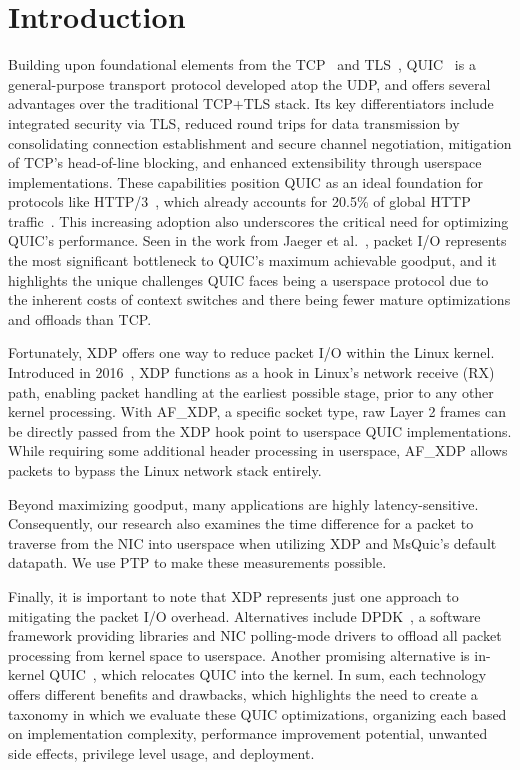 \chapter{Introduction}
\label{chap:introduction}

Building upon foundational elements from the \ac{TCP}~\cite{rfc9293} and \ac{TLS}~\cite{rfc8446}, QUIC~\cite{rfc9000} is a general-purpose transport protocol developed atop the \ac{UDP}, and offers several advantages over the traditional \ac{TCP}+\ac{TLS} stack. Its key differentiators include integrated security via \ac{TLS}, reduced round trips for data transmission by consolidating connection establishment and secure channel negotiation, mitigation of \ac{TCP}'s head-of-line blocking, and enhanced extensibility through userspace implementations. These capabilities position QUIC as an ideal foundation for protocols like \ac{HTTP/3}~\cite{rfc9114}, which already accounts for 20.5\% of global HTTP traffic~\cite{cloudflare2024}. This increasing adoption also underscores the critical need for optimizing QUIC's performance. Seen in the work from Jaeger et al.~\cite{10186365}, packet I/O represents the most significant bottleneck to QUIC's maximum achievable goodput, and it highlights the unique challenges QUIC faces being a userspace protocol due to the inherent costs of context switches and there being fewer mature optimizations and offloads than \ac{TCP}.

Fortunately, \ac{XDP} offers one way to reduce packet I/O within the Linux kernel. Introduced in 2016~\cite{linux_xdp_merge_2016}, \ac{XDP} functions as a hook in Linux's network receive (RX) path, enabling packet handling at the earliest possible stage, prior to any other kernel processing. With AF\_XDP, a specific socket type, raw Layer 2 frames can be directly passed from the \ac{XDP} hook point to userspace QUIC implementations. While requiring some additional header processing in userspace, AF\_XDP allows packets to bypass the Linux network stack entirely.

Beyond maximizing goodput, many applications are highly latency-sensitive. Consequently, our research also examines the time difference for a packet to traverse from the \ac{NIC} into userspace when utilizing \ac{XDP} and MsQuic's default datapath. We use \ac{PTP} to make these measurements possible.

Finally, it is important to note that \ac{XDP} represents just one approach to mitigating the packet I/O overhead. Alternatives include \ac{DPDK}~\cite{dpdk}, a software framework providing libraries and \ac{NIC} polling-mode drivers to offload all packet processing from kernel space to userspace. Another promising alternative is in-kernel QUIC~\cite{quic_lxin}, which relocates QUIC into the kernel. In sum, each technology offers different benefits and drawbacks, which highlights the need to create a taxonomy in which we evaluate these QUIC optimizations, organizing each based on implementation complexity, performance improvement potential, unwanted side effects, privilege level usage, and deployment.

